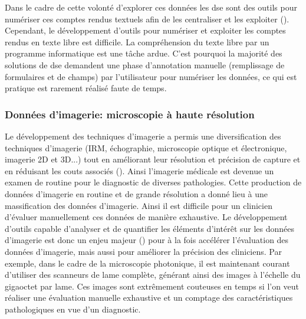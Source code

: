 Dans le cadre de cette volonté d'explorer ces données les \gls{dse} sont des outils pour numériser ces comptes rendus textuels afin de les centraliser et les exploiter (\cite{graber_impact_2017}). Cependant, le développement d'outils pour numériser et exploiter les comptes rendus en texte libre est difficile. La compréhension du texte libre par un programme informatique est une tâche ardue. C'est pourquoi la majorité des solutions de \gls{dse} demandent une phase d'annotation manuelle (remplissage de formulaires et de champs) par l'utilisateur pour numériser les données, ce qui est pratique est rarement réalisé faute de temps.

\subsubsection{Données d'imagerie: microscopie à haute résolution}
Le développement des techniques d'imagerie a permis une diversification des techniques d'imagerie (IRM, échographie, microscopie optique et électronique, imagerie 2D et 3D...) tout en améliorant leur résolution et précision de capture  et en réduisant les couts associés (\cite{abdallah_history_2017, prakash_super-resolution_2022, sheppard_structured_2021}). Ainsi l'imagerie médicale est devenue un examen de routine pour le diagnostic de diverses pathologies. Cette production de données d'imagerie en routine et de grande résolution a donné lieu à une massification des données d'imagerie. Ainsi il est difficile pour un clinicien d'évaluer manuellement ces données de manière exhaustive. Le développement d'outils capable d'analyser et de quantifier les éléments d'intérêt sur les données d'imagerie est donc un enjeu majeur (\cite{tchito_tchapga_biomedical_2021}) pour à la fois accélérer l'évaluation des données d'imagerie, mais aussi pour améliorer la précision des cliniciens. Par exemple, dans le cadre de la microscopie photonique, il est maintenant courant d'utiliser des scanneurs de lame complète, générant ainsi des images à l'échelle du gigaoctet par lame. Ces images sont extrêmement couteuses en temps si l’on veut réaliser une évaluation manuelle exhaustive et un comptage des caractéristiques pathologiques en vue d'un diagnostic.

